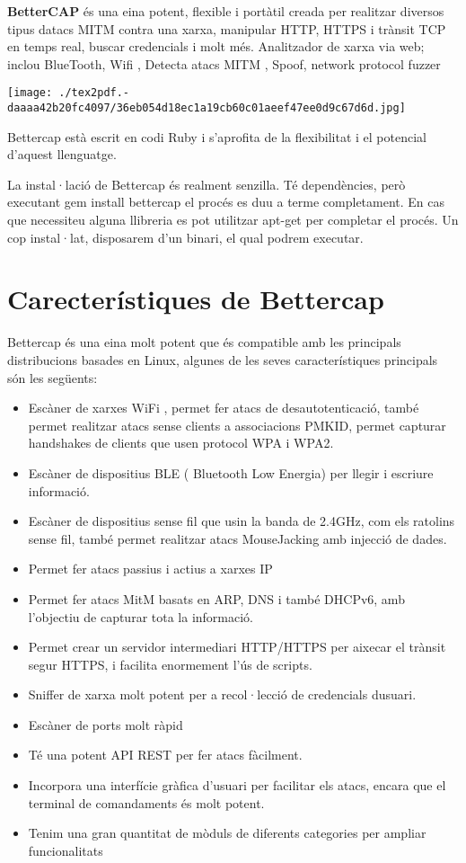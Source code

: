 \documentclass[]{article}
\begin{document}
\textbf{BetterCAP} és una eina potent, flexible i portàtil creada per
realitzar diversos tipus datacs MITM contra una xarxa, manipular HTTP,
HTTPS i trànsit TCP en temps real, buscar credencials i molt més.
Analitzador de xarxa via web; inclou BlueTooth, Wifi , Detecta atacs
MITM , Spoof, network protocol fuzzer

\texttt{[image: ./tex2pdf.-daaaa42b20fc4097/36eb054d18ec1a19cb60c01aeef47ee0d9c67d6d.jpg]}

Bettercap està escrit en codi Ruby i s'aprofita de la flexibilitat i el
potencial d'aquest llenguatge.

La instal·lació de Bettercap és realment senzilla. Té dependències, però
executant gem install bettercap el procés es duu a terme completament.
En cas que necessiteu alguna llibreria es pot utilitzar apt-get per
completar el procés. Un cop instal·lat, disposarem d'un binari, el qual
podrem executar.

\hypertarget{carecteruxedstiques-de-bettercap}{%
\section{\texorpdfstring{\textbf{Carecterístiques de
Bettercap}}{Carecterístiques de Bettercap}}\label{carecteruxedstiques-de-bettercap}}

Bettercap és una eina molt potent que és compatible amb les principals
distribucions basades en Linux, algunes de les seves característiques
principals són les següents:

\begin{itemize}
\item
  Escàner de xarxes WiFi , permet fer atacs de desautotenticació, també
  permet realitzar atacs sense clients a associacions PMKID, permet
  capturar handshakes de clients que usen protocol WPA i WPA2.
\item
  Escàner de dispositius BLE ( Bluetooth Low Energia) per llegir i
  escriure informació.
\item
  Escàner de dispositius sense fil que usin la banda de 2.4GHz, com els
  ratolins sense fil, també permet realitzar atacs MouseJacking amb
  injecció de dades.
\item
  Permet fer atacs passius i actius a xarxes IP
\item
  Permet fer atacs MitM basats en ARP, DNS i també DHCPv6, amb
  l'objectiu de capturar tota la informació.
\item
  Permet crear un servidor intermediari HTTP/HTTPS per aixecar el
  trànsit segur HTTPS, i facilita enormement l'ús de scripts.
\item
  Sniffer de xarxa molt potent per a recol·lecció de credencials
  dusuari.
\item
  Escàner de ports molt ràpid
\item
  Té una potent API REST per fer atacs fàcilment.
\item
  Incorpora una interfície gràfica d'usuari per facilitar els atacs,
  encara que el terminal de comandaments és molt potent.
\item
  Tenim una gran quantitat de mòduls de diferents categories per ampliar
  funcionalitats
\end{itemize}
\end{document}
